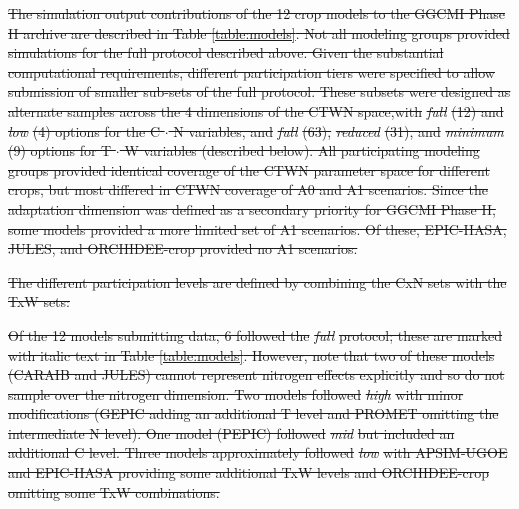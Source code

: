 \documentclass[gmd, manuscript]{copernicus} %
\providecommand{\DIFdel}[1]{{\protect\color{red}\sout{#1}}}                      %
\begin{document}
\DIFdel{The simulation output contributions of the 12 crop models to the GGCMI Phase II archive are described in Table \ref{table:models}.
Not all modeling groups provided simulations for the full protocol described above. 
Given the substantial computational requirements, different participation tiers were specified to allow submission of smaller sub-sets of the full protocol. 
These subsets were designed as alternate samples across the 4 dimensions of the CTWN space,with }\textit{\DIFdel{full}} %
\DIFdel{(12) and }\textit{\DIFdel{low}} %
\DIFdel{(4) options for the C $\cdot$ N variables, and }\textit{\DIFdel{full}} %
\DIFdel{(63), }\textit{\DIFdel{reduced}} %
\DIFdel{(31), and }\textit{\DIFdel{minimum}} %
\DIFdel{(9) options for T $\cdot$ W variables (described below). 
All participating modeling groups provided identical coverage of the CTWN parameter space for different crops, but most differed in CTWN coverage of A0 and A1 scenarios. Since the adaptation dimension was defined as a secondary priority for GGCMI Phase II, some models provided a more limited set of A1 scenarios. Of these, EPIC-IIASA, JULES, and ORCHIDEE-crop provided no A1 scenarios.
}%

\DIFdel{The different participation levels are defined by combining the CxN sets with the TxW sets:
}%
\begin{itemize}%

\end{itemize}%

\DIFdel{Of the 12 models submitting data, 6 followed the }\textit{\DIFdel{full}} %
\DIFdel{protocol; these are marked with italic text in Table \ref{table:models}. 
However, note that two of these models (CARAIB and JULES) cannot represent nitrogen effects explicitly and so do not sample over the nitrogen dimension. 
Two models followed }\textit{\DIFdel{high}} %
\DIFdel{with minor modifications (GEPIC adding an additional T level and PROMET omitting the intermediate N level). 
One model (PEPIC) followed }\textit{\DIFdel{mid}} %
\DIFdel{but included an additional C level. 
Three models approximately followed }\textit{\DIFdel{low}} %
\DIFdel{with APSIM-UGOE and EPIC-IIASA providing some additional TxW levels and ORCHIDEE-crop omitting some TxW combinations.  
}%
\end{document}
